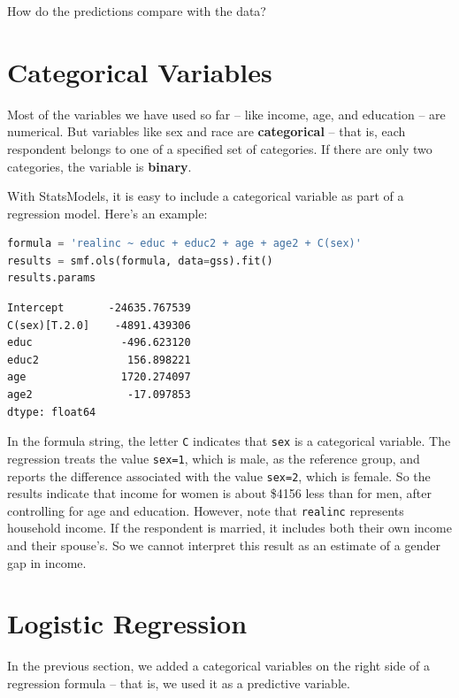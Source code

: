 How do the predictions compare with the data?

\hypertarget{categorical-variables}{%
\section{Categorical Variables}\label{categorical-variables}}

Most of the variables we have used so far -- like income, age, and
education -- are numerical. But variables like sex and race are
\textbf{categorical} -- that is, each respondent belongs to one of a
specified set of categories. If there are only two categories, the
variable is \textbf{binary}.

With StatsModels, it is easy to include a categorical variable as part
of a regression model. Here's an example:

\begin{lstlisting}[language=Python,style=source]
formula = 'realinc ~ educ + educ2 + age + age2 + C(sex)'
results = smf.ols(formula, data=gss).fit()
results.params
\end{lstlisting}

\begin{lstlisting}[style=output]
Intercept       -24635.767539
C(sex)[T.2.0]    -4891.439306
educ              -496.623120
educ2              156.898221
age               1720.274097
age2               -17.097853
dtype: float64
\end{lstlisting}

In the formula string, the letter \passthrough{\lstinline!C!} indicates
that \passthrough{\lstinline!sex!} is a categorical variable. The
regression treats the value \passthrough{\lstinline!sex=1!}, which is
male, as the reference group, and reports the difference associated with
the value \passthrough{\lstinline!sex=2!}, which is female. So the
results indicate that income for women is about \$4156 less than for
men, after controlling for age and education. However, note that
\passthrough{\lstinline!realinc!} represents household income. If the
respondent is married, it includes both their own income and their
spouse's. So we cannot interpret this result as an estimate of a gender
gap in income.

\hypertarget{logistic-regression}{%
\section{Logistic Regression}\label{logistic-regression}}

In the previous section, we added a categorical variables on the right
side of a regression formula -- that is, we used it as a predictive
variable.

